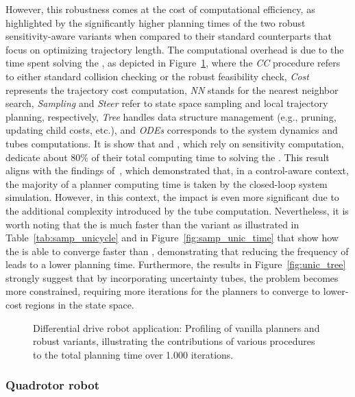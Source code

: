 However, this robustness comes at the cost of computational efficiency, as highlighted by the significantly higher planning times of the two robust sensitivity-aware variants when compared to their standard counterparts that focus on optimizing trajectory length.
The computational overhead is due to the time spent solving the , as depicted in Figure~\ref{fig:profiling_unic}, where the \emph{CC} procedure refers to either standard collision checking or the robust feasibility check, \emph{Cost} represents the trajectory cost computation, \emph{NN} stands for the nearest neighbor search, \emph{Sampling} and \emph{Steer} refer to state space sampling and local trajectory planning, respectively, \emph{Tree} handles data structure management (e.g., pruning, updating child costs, etc.), and \emph{ODEs} corresponds to the system dynamics and tubes computations.
It is show that  and , which rely on sensitivity computation, dedicate about 80\% of their total computing time to solving the .
This result aligns with the findings of~\cite{cTognon}, which demonstrated that, in a control-aware context, the majority of a planner computing time is taken by the closed-loop system simulation.
However, in this context, the impact is even more significant due to the additional complexity introduced by the tube computation.
Nevertheless, it is worth noting that the  is much faster than the  variant as illustrated in Table~\ref{tab:samp_unicycle} and in Figure~\ref{fig:samp_unic_time} that show how the  is able to converge faster than , demonstrating that reducing the frequency of  leads to a lower planning time.
Furthermore, the results in Figure~\ref{fig:unic_tree} strongly suggest that by incorporating uncertainty tubes, the problem becomes more constrained, requiring more iterations for the planners to converge to lower-cost regions in the state space.

\begin{figure} [t!]
    \centering
     
    \caption{Differential drive robot application: Profiling of vanilla planners and robust  variants, illustrating the contributions of various procedures to the total planning time over 1.000 iterations.}%
    \label{fig:profiling_unic}%
\end{figure}

\subsubsection{Quadrotor robot}\label{sec:quad_setup_samp}

